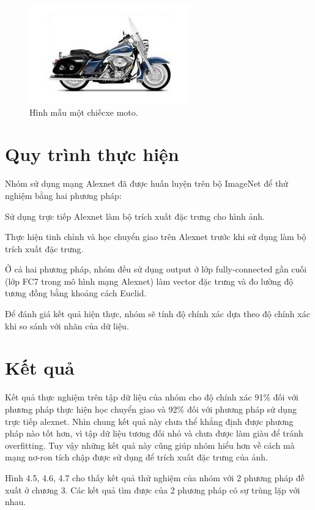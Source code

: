 \documentclass[a4paper,14pt]{extreport}
\begin{document}
\begin{figure}
    \centering
    \includegraphics[scale=1]{img/motobike-sample.jpg}
    \caption{Hình mẫu một chiếcxe moto.}
    \label{fig:moto-sample}
\end{figure}







\section{Quy trình thực hiện}
Nhóm sử dụng mạng Alexnet đã được huấn luyện trên bộ ImageNet để thử nghiệm bằng hai phương pháp:
\par
Sử dụng trực tiếp Alexnet làm bộ trích xuất đặc trưng cho hình ảnh.
\par
Thực hiện tinh chỉnh và học chuyển giao trên Alexnet trước khi sử dụng làm bộ trích xuất đặc trưng.
\par
Ở cả hai phương pháp, nhóm đều sử dụng output ở lớp fully-connected gần cuối (lớp FC7 trong mô hình mạng Alexnet) làm vector đặc trưng và đo lường độ tương đồng bằng khoảng cách Euclid.
\par
Để đánh giá kết quả hiện thực, nhóm sẽ tính độ chính xác dựa theo độ chính xác khi so sánh với nhãn của dữ liệu.
\section{Kết quả}

Kết quả thực nghiệm trên tập dữ liệu của nhóm cho độ chính xác 91\% đối với phương pháp thực hiện học chuyển giao và 92\% đối với phương pháp sử dụng trực tiếp alexnet. 
Nhìn chung kết quả này chưa thể khẳng định được phương pháp nào tốt hơn, vì tập dữ liệu 
tương đối nhỏ và chưa được làm giàu để tránh overfitting. Tuy vậy những kết quả này cũng 
giúp nhóm hiểu hơn về cách mà mạng nơ-ron tích chập được sử dụng để trích xuất đặc trưng 
của ảnh.

Hình 4.5, 4.6, 4.7 cho thấy kết quả thử nghiệm của nhóm với 2 phương pháp đề xuất ở chương 3. Các kết quả tìm được của 2 phương pháp có sự trùng lặp với nhau.
\end{document}

